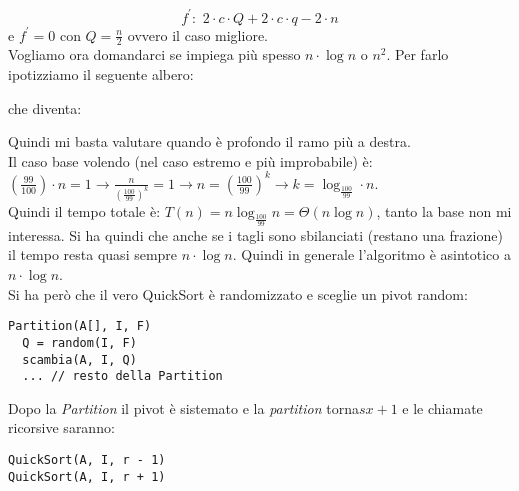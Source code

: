 \documentclass[a4paper,12pt,oneside,tikz]{book}
\begin{document}
$$f^{'}:\,\, 2\cdot c\cdot Q+2\cdot c\cdot q-2\cdot n$$
e $f^{'}=0$ con $Q=\frac{n}{2}$ ovvero il caso migliore.\\
Vogliamo ora domandarci se impiega più spesso $n\cdot\log n$ o $n^2$. Per farlo ipotizziamo il seguente albero:
\begin{center}
\end{center}
che diventa:
\begin{center}
\end{center}
\newpage
Quindi mi basta valutare quando è profondo il ramo più a destra.\\
Il caso base volendo (nel caso estremo e più improbabile) è: $\left(\frac{99}{100}\right)\cdot n=1\rightarrow\frac{n}{\left(\frac{100}{99}\right)^k}=1\rightarrow n=\left(\frac{100}{99}\right)^k\rightarrow k=\log_{\frac{100}{99}}\cdot n$. \\Quindi il tempo totale è: $T(n)=n\log_{\frac{100}{99}}n=\Theta(n\log n)$, tanto la base non mi interessa.
Si ha quindi che anche se i tagli sono sbilanciati (restano una frazione) il tempo resta quasi sempre $n\cdot\log n$. Quindi in generale l'algoritmo è asintotico a $n\cdot\log n$. \\
Si ha però che il vero QuickSort è randomizzato e sceglie un pivot random:
\begin{verbatim}
Partition(A[], I, F)
  Q = random(I, F)
  scambia(A, I, Q)
  ... // resto della Partition
\end{verbatim}
Dopo la \textit{Partition} il pivot è sistemato e la \textit{partition} torna$sx+1$ e le chiamate ricorsive saranno:
\begin{verbatim}
QuickSort(A, I, r - 1)
QuickSort(A, I, r + 1)
\end{verbatim}
\end{document}
